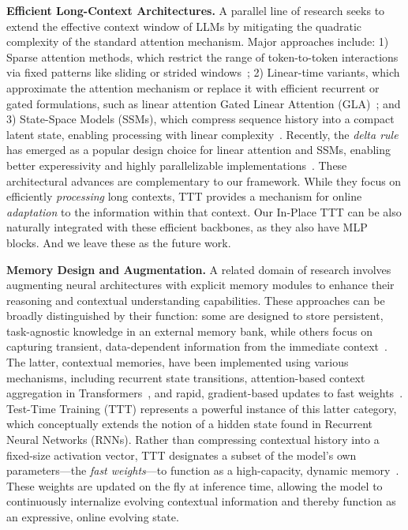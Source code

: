 \textbf{Efficient Long-Context Architectures.}
A parallel line of research seeks to extend the effective context window of LLMs by mitigating the quadratic complexity of the standard attention mechanism. Major approaches include: 1) Sparse attention methods, which restrict the range of token-to-token interactions via fixed patterns like sliding or strided windows~\citep{child2019generating,beltagy2020longformer,yuan2025nativesparseattentionhardwarealigned}; 2) Linear-time variants, which approximate the attention mechanism or replace it with efficient recurrent or gated formulations, such as linear attention \citep{katharopoulos2020linear,schlag2021linear} Gated Linear Attention (GLA)~\citep{yang2023gla}; and 3) State-Space Models (SSMs), which compress sequence history into a compact latent state, enabling processing with linear complexity~\citep{dao2023mamba,dao2024transformersssmsgeneralizedmodels}. Recently, the \textit{delta rule} has emerged as a popular design choice for linear attention and SSMs, enabling better experessivity and highly parallelizable implementations~\citep{yang2024delta}.
These architectural advances are complementary to our framework. While they focus on efficiently \textit{processing} long contexts, TTT provides a mechanism for online \textit{adaptation} to the information within that context. Our In-Place TTT can be also naturally integrated with these efficient backbones, as they also have MLP blocks. And we leave these as the future work.


\textbf{Memory Design and Augmentation.}
A related domain of research involves augmenting neural architectures with explicit memory modules to enhance their reasoning and contextual understanding capabilities. These approaches can be broadly distinguished by their function: some are designed to store persistent, task-agnostic knowledge in an external memory bank, while others focus on capturing transient, data-dependent information from the immediate context~\citep{khandelwal2019knnlm,guu2020realm,lewis2020rag,wang2024memoryllmselfupdatablelargelanguage,yu2025memagent}. The latter, contextual memories, have been implemented using various mechanisms, including recurrent state transitions, attention-based context aggregation in Transformers~\citep{dai2019transformerxl}, and rapid, gradient-based updates to fast weights~\citep{yang2024delta}. Test-Time Training (TTT) represents a powerful instance of this latter category, which conceptually extends the notion of a hidden state found in Recurrent Neural Networks (RNNs). Rather than compressing contextual history into a fixed-size activation vector, TTT designates a subset of the model's own parameters—the \textit{fast weights}—to function as a high-capacity, dynamic memory~\citep{ba2016fastweights,schlag2021linear}. These weights are updated on the fly at inference time, allowing the model to continuously internalize evolving contextual information and thereby function as an expressive, online evolving state.

